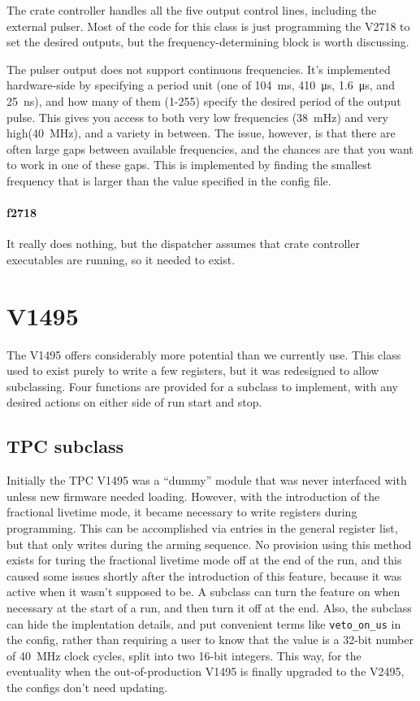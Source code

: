 The crate controller handles all the five output control lines, including the external pulser.
Most of the code for this class is just programming the V2718 to set the desired outputs, but the frequency-determining block is worth discussing.

The pulser output does not support continuous frequencies.
It's implemented hardware-side by specifying a period unit (one of \SI{104}{\milli\second}, \SI{410}{\micro\second}, \SI{1.6}{\micro\second}, and \SI{25}{\nano\second}), and how many of them (1-255) specify the desired period of the output pulse.
This gives you access to both very low frequencies (\SI{38}{\milli\hertz}) and very high(\SI{40}{\mega\hertz}), and a variety in between.
The issue, however, is that there are often large gaps between available frequencies, and the chances are that you want to work in one of these gaps.
This is implemented by finding the smallest frequency that is larger than the value specified in the config file.

\paragraph{f2718}

It really does nothing, but the dispatcher assumes that crate controller executables are running, so it needed to exist.

\section{V1495}

The V1495 offers considerably more potential than we currently use.
This class used to exist purely to write a few registers, but it was redesigned to allow subclassing.
Four functions are provided for a subclass to implement, with any desired actions on either side of run start and stop.

\subsection{TPC subclass}

Initially the TPC V1495 was a ``dummy'' module that was never interfaced with unless new firmware needed loading.
However, with the introduction of the fractional livetime mode, it became necessary to write registers during programming.
This can be accomplished via entries in the general register list, but that only writes during the arming sequence.
No provision using this method exists for turing the fractional livetime mode off at the end of the run, and this caused some issues shortly after the introduction of this feature, because it was active when it wasn't supposed to be.
A subclass can turn the feature on when necessary at the start of a run, and then turn it off at the end.
Also, the subclass can hide the implentation details, and put convenient terms like \texttt{veto\_on\_us} in the config, rather than requiring a user to know that the value is a 32-bit number of 40~MHz clock cycles, split into two 16-bit integers.
This way, for the eventuality when the out-of-production V1495 is finally upgraded to the V2495, the configs don't need updating.

